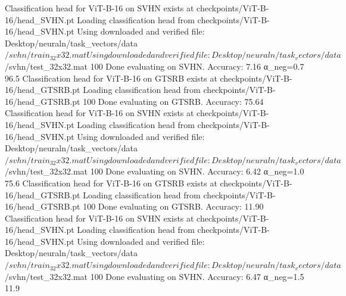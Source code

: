 Classification head for ViT-B-16 on SVHN exists at checkpoints/ViT-B-16/head_SVHN.pt
Loading classification head from checkpoints/ViT-B-16/head_SVHN.pt
Using downloaded and verified file: Desktop/neuraln/task_vectors/data$/svhn/train_32x32.mat
Using downloaded and verified file: Desktop/neuraln/task_vectors/data$/svhn/test_32x32.mat
100%
Done evaluating on SVHN. Accuracy: 7.16%
  α_neg=0.7         96.5%
Classification head for ViT-B-16 on GTSRB exists at checkpoints/ViT-B-16/head_GTSRB.pt
Loading classification head from checkpoints/ViT-B-16/head_GTSRB.pt
100%
Done evaluating on GTSRB. Accuracy: 75.64%
Classification head for ViT-B-16 on SVHN exists at checkpoints/ViT-B-16/head_SVHN.pt
Loading classification head from checkpoints/ViT-B-16/head_SVHN.pt
Using downloaded and verified file: Desktop/neuraln/task_vectors/data$/svhn/train_32x32.mat
Using downloaded and verified file: Desktop/neuraln/task_vectors/data$/svhn/test_32x32.mat
100%
Done evaluating on SVHN. Accuracy: 6.42%
  α_neg=1.0         75.6%
Classification head for ViT-B-16 on GTSRB exists at checkpoints/ViT-B-16/head_GTSRB.pt
Loading classification head from checkpoints/ViT-B-16/head_GTSRB.pt
100%
Done evaluating on GTSRB. Accuracy: 11.90%
Classification head for ViT-B-16 on SVHN exists at checkpoints/ViT-B-16/head_SVHN.pt
Loading classification head from checkpoints/ViT-B-16/head_SVHN.pt
Using downloaded and verified file: Desktop/neuraln/task_vectors/data$/svhn/train_32x32.mat
Using downloaded and verified file: Desktop/neuraln/task_vectors/data$/svhn/test_32x32.mat
100%
Done evaluating on SVHN. Accuracy: 6.47%
  α_neg=1.5         11.9%

